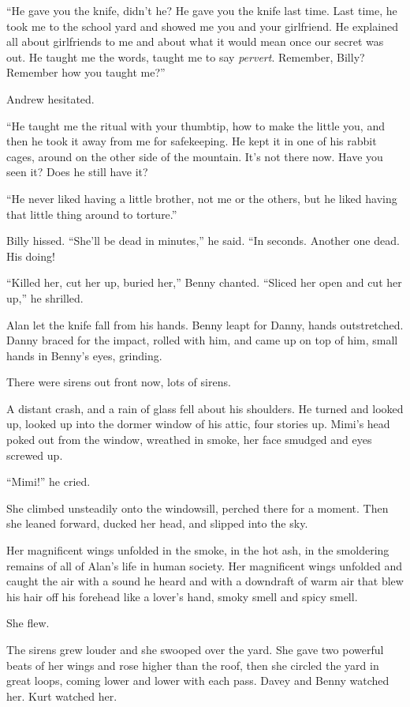 \documentclass{article}
\begin{document}
``He gave you the knife, didn't he?  He gave you the knife last time. 
Last time, he took me to the school yard and showed me you and your
girlfriend.  He explained all about girlfriends to me and about what
it would mean once our secret was out.  He taught me the words, taught
me to say \textit{pervert}.  Remember, Billy?  Remember how you taught
me?''

Andrew hesitated. 

``He taught me the ritual with your thumbtip, how to make the little
you, and then he took it away from me for safekeeping.  He kept it in
one of his rabbit cages, around on the other side of the mountain. 
It's not there now.  Have you seen it?  Does he still have it?

``He never liked having a little brother, not me or the others, but he
liked having that little thing around to torture.''

Billy hissed.  ``She'll be dead in minutes,'' he said.  ``In seconds. 
Another one dead.  His doing!

``Killed her, cut her up, buried her,'' Benny chanted.  ``Sliced her
open and cut her up,'' he shrilled.

Alan let the knife fall from his hands.  Benny leapt for Danny, hands
outstretched.  Danny braced for the impact, rolled with him, and came
up on top of him, small hands in Benny's eyes, grinding.

There were sirens out front now, lots of sirens.

A distant crash, and a rain of glass fell about his shoulders.  He
turned and looked up, looked up into the dormer window of his attic,
four stories up.  Mimi's head poked out from the window, wreathed in
smoke, her face smudged and eyes screwed up.

``Mimi!'' he cried.

She climbed unsteadily onto the windowsill, perched there for a
moment.  Then she leaned forward, ducked her head, and slipped into
the sky.

Her magnificent wings unfolded in the smoke, in the hot ash, in the
smoldering remains of all of Alan's life in human society.  Her
magnificent wings unfolded and caught the air with a sound he heard
and with a downdraft of warm air that blew his hair off his forehead
like a lover's hand, smoky smell and spicy smell. 

She flew.

The sirens grew louder and she swooped over the yard.  She gave two
powerful beats of her wings and rose higher than the roof, then she
circled the yard in great loops, coming lower and lower with each
pass.  Davey and Benny watched her.  Kurt watched her. 
\end{document}
